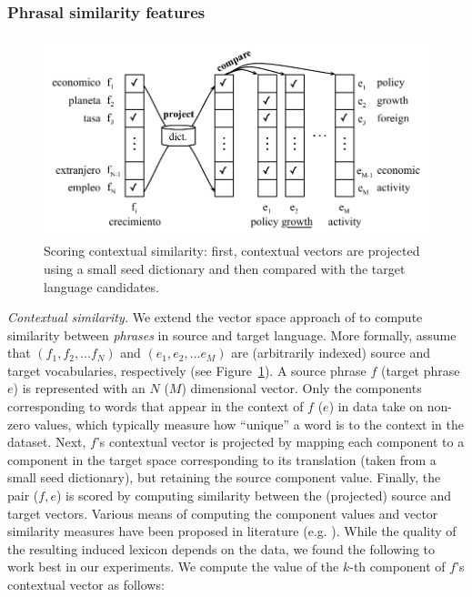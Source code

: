\documentclass[11pt]{article}
\newcommand{\figref}[1]{Figure~\ref{#1}}
\begin{document}
\subsubsection{Phrasal similarity features} \label{sect:phrasalfeats}

\begin{figure}
\includegraphics[width=\linewidth]{../figures/contextual/contextual}
\caption{Scoring contextual similarity: first, contextual vectors are projected using a small seed dictionary and then compared with the target language candidates.}
\label{fig:contextual}
\end{figure}

\noindent\emph{Contextual similarity.}  We extend the vector space approach of \cite{Rapp:1999} to compute similarity between \emph{phrases} in source and target language.  More formally, assume that $(f_{1}, f_{2}, \dots f_{N})$ and $(e_{1}, e_{2}, \dots e_{M})$ are (arbitrarily indexed) source and target vocabularies, respectively (see \figref{fig:contextual}).  A source phrase $f$ (target phrase $e$) is represented with an $N$ ($M$) dimensional vector.  Only the components corresponding to words that appear in the context of $f$ ($e$) in data take on non-zero values, which typically measure how ``unique'' a word is to the context in the dataset.  Next, $f$'s contextual vector is projected by mapping each component to a component in the target space corresponding to its translation (taken from a small seed dictionary), but retaining the source component value.  Finally, the pair ($f, e$) is scored by computing similarity between the (projected) source and target vectors.  Various means of computing the component values and vector similarity measures have been proposed in literature (e.g. \cite{Rapp:1999,Fung:1998}).  While the quality of the resulting induced lexicon depends on the data, we found the following to work best in our experiments.  We compute the value of the $k$-th component of $f$'s contextual vector  as follows: 
\end{document}
